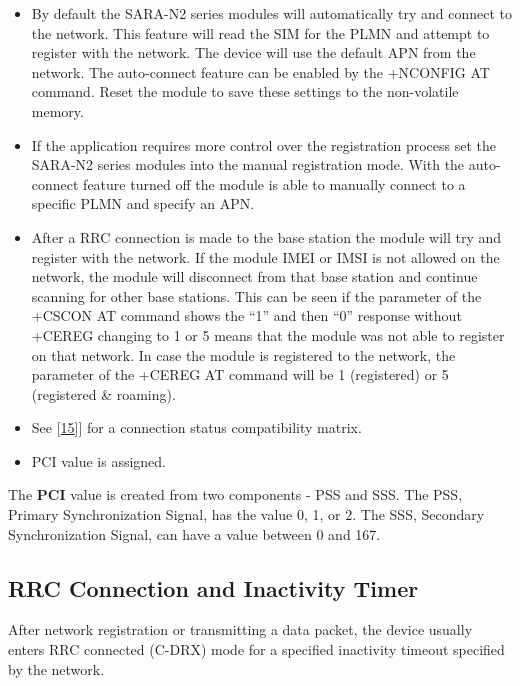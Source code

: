 \documentclass[]{article}
\begin{document}
\begin{itemize}
\item
  By default the SARA-N2 series modules will automatically try and
  connect to the network. This feature will read the SIM for the PLMN
  and attempt to register with the network. The device will use the
  default APN from the network. The auto-connect feature can be enabled
  by the +NCONFIG AT command. Reset the module to save these settings to
  the non-volatile memory.
\item
  If the application requires more control over the registration process
  set the SARA-N2 series modules into the manual registration mode. With
  the auto-connect feature turned off the module is able to manually
  connect to a specific PLMN and specify an APN.
\item
  After a RRC connection is made to the base station the module will try
  and register with the network. If the module IMEI or IMSI is not
  allowed on the network, the module will disconnect from that base
  station and continue scanning for other base stations. This can be
  seen if the parameter of the +CSCON AT command shows the ``1'' and
  then ``0'' response without +CEREG changing to 1 or 5 means that the
  module was not able to register on that network. In case the module is
  registered to the network, the parameter of the +CEREG AT command will
  be 1 (registered) or 5 (registered \& roaming).
\item
  See {[}\protect\hyperlink{ref-ubloxAppNote2018}{15}{]}{]} for a
  connection status compatibility matrix.
\item
  PCI value is assigned.
\end{itemize}

The \textbf{PCI} value is created from two components - PSS and SSS. The
PSS, Primary Synchronization Signal, has the value 0, 1, or 2. The SSS,
Secondary Synchronization Signal, can have a value between 0 and 167.

\hypertarget{rrc_inactivity}{%
\subsection{RRC Connection and Inactivity Timer}\label{rrc_inactivity}}

After network registration or transmitting a data packet, the device
usually enters RRC connected (C-DRX) mode for a specified inactivity
timeout specified by the network.
\end{document}
